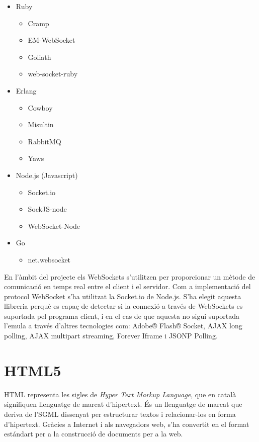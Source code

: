 \begin{itemize}
{    }
    \item{Ruby
    \begin{itemize}
        \item{Cramp}
        \item{EM-WebSocket}
        \item{Goliath}
        \item{web-socket-ruby}
    \end{itemize}
    }
    \item{Erlang
    \begin{itemize}
        \item{Cowboy}
        \item{Misultin}
        \item{RabbitMQ}
        \item{Yaws}
    \end{itemize}
    }
    \item{Node.js (Javascript)
    \begin{itemize}
        \item{Socket.io}
        \item{SockJS-node}
        \item{WebSocket-Node}
    \end{itemize}
    }
    \item{Go
    \begin{itemize}
        \item{net.websocket}
    \end{itemize}
    }
\end{itemize}    

En l'àmbit del projecte els WebSockets s'utilitzen per proporcionar un mètode de comunicació en temps real entre el client i el servidor. Com a implementació del protocol WebSocket s'ha utilitzat la Socket.io de Node.js. S'ha elegit aquesta llibreria perquè es capaç de detectar si la connexió a través de WebSockets es suportada pel programa client, i en el cas de que aquesta no sigui suportada l'emula a través d'altres tecnologies com:  Adobe® Flash® Socket,  AJAX long polling, AJAX multipart streaming, Forever Iframe i JSONP Polling.



\section{HTML5}

HTML representa les sigles de \emph{Hyper Text Markup Language}, que en català signifiquen llenguatge de marcat d'hipertext. És un llenguatge de marcat que deriva de l'SGML dissenyat per estructurar textos i relacionar-los en forma d'hipertext. Gràcies a Internet i als navegadors web, s'ha convertit en el format estándart per a la construcció de documents per a la web. 

